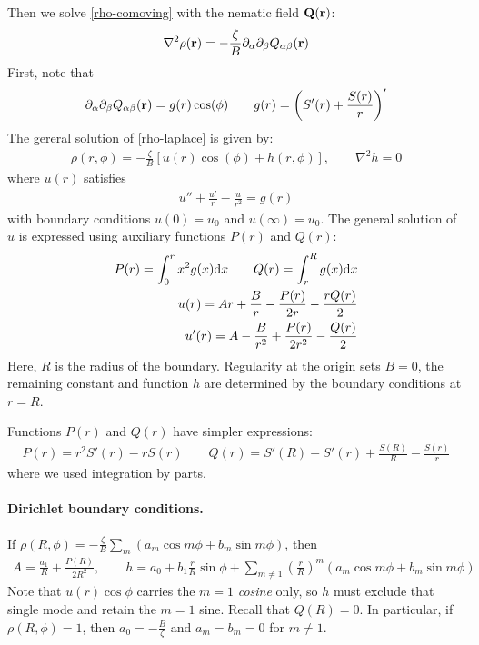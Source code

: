\documentclass[a5paper]{article}
\begin{document}
Then we solve \cref{rho-comoving} with the nematic field $\mathbf{Q}(\mathbf{r})$:
\begin{align}\label{rho-laplace}
    \nabla^2 \rho(\mathbf{r}) = -\frac{\zeta}{B} \partial_\alpha\partial_\beta Q_{\alpha\beta}(\mathbf{r})
\end{align}
First, note that
\begin{align}
    \partial_\alpha\partial_\beta Q_{\alpha\beta}(\mathbf{r}) = g(r) \cos(\phi)
    \qquad
    g(r) = \left(S'(r)+\frac{S(r)}{r}\right)'
\end{align}
The gereral solution of \cref{rho-laplace} is given by:
\begin{align}
    \rho(r, \phi) = -\frac{\zeta}{B} \left[u(r) \cos(\phi) + h(r, \phi)\right],\qquad \nabla^2 h=0
\end{align}
where $u(r)$ satisfies 
\begin{align}
    u''+\frac{u'}{r}-\frac{u}{r^2} = g(r)
\end{align}
with boundary conditions $u(0) = u_0$ and $u(\infty) = u_0$. The general solution of $u$ is expressed using auxiliary functions $P(r)$ and $Q(r)$:
\begin{align}
    P(r) = \int_0^r x^2 g(x) \mathrm{d} x \qquad Q(r) = \int_r^R g(x)\mathrm{d} x
    \\
    u(r)=A r+\frac{B}{r} - \frac{P(r)}{2 r}-\frac{r Q(r)}{2}
    \\
    u'(r) = A - \frac{B}{r^2} + \frac{P(r)}{2 r^2}-\frac{Q(r)}{2}
\end{align}
Here, $R$ is the radius of the boundary. Regularity at the origin sets $B=0$, the remaining constant and function $h$ are determined by the boundary conditions at $r=R$.


Functions $P(r)$ and $Q(r)$ have simpler expressions:\
\begin{align}
    P(r) = r^2 S'(r) - r S(r)
    \qquad
    Q(r) = S'(R) - S'(r) + \frac{S(R)}{R} - \frac{S(r)}{r}
\end{align}
where we used integration by parts.

\paragraph{Dirichlet boundary conditions.}
If $\rho(R,\phi) = -\frac{\zeta}{B} \sum_m \left(a_m \cos m\phi + b_m \sin m\phi\right)$, then
\begin{align}
    A = \frac{a_1}{R} + \frac{P(R)}{2R^2},
    \qquad
    h=a_0 + b_1\frac{r}{R}\sin\phi + \sum_{m\ne 1} \left(\frac{r}{R}\right)^m (a_m \cos m\phi + b_m \sin m\phi)
\end{align}
Note that $u(r)\cos\phi$ carries the $m=1$ \emph{cosine} only, so $h$ must exclude that single mode and retain the $m=1$ sine.
Recall that $Q(R)=0$.
In particular, if $\rho(R,\phi) = 1$, then $a_0 = -\frac{B}{\zeta}$ and $a_m = b_m = 0$ for $m\ne 1$.
\end{document}

